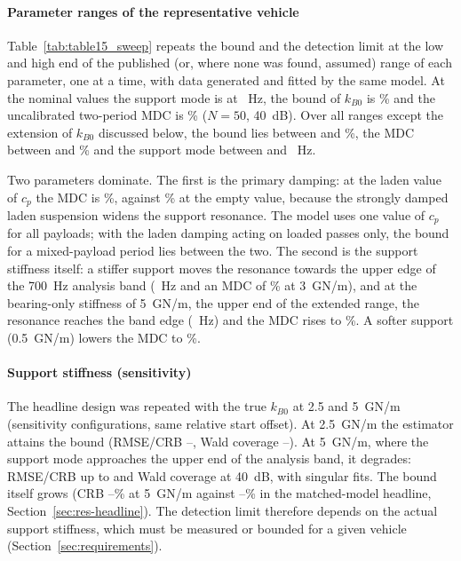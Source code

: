 
\paragraph{Parameter ranges of the representative vehicle}\label{sec:res-sweep}
Table~\ref{tab:table15_sweep} repeats the bound and the detection limit at the low and high end of the
published (or, where none was found, assumed) range of each parameter, one at a time, with data
generated and fitted by the same model. At the nominal values the support mode is at
\SweepNomMode~Hz, the bound of $k_{B0}$ is \SweepNomCRB\% and the uncalibrated two-period MDC is
\SweepNomMDC\% ($N=50$, 40~dB). Over all ranges except the extension of $k_{B0}$ discussed below, the
bound lies between \SweepCRBMin{} and \SweepCRBMax\%, the MDC between \SweepMDCMin{} and
\SweepMDCMax\% and the support mode between \SweepModeMin{} and \SweepModeMax~Hz.

Two parameters dominate. The first is the primary damping: at the laden value of $c_p$ the MDC is
\SweepCpMDCHi\%, against \SweepCpMDCLo\% at the empty value, because the strongly damped laden
suspension widens the support resonance. The model uses one value of $c_p$ for all payloads; with the
laden damping acting on loaded passes only, the bound for a mixed-payload period lies between the two.
The second is the support stiffness itself: a stiffer support moves the resonance towards the upper
edge of the 700~Hz analysis band (\SweepKBModeHi~Hz and an MDC of \SweepKBMDCHi\% at 3~GN/m), and at
the bearing-only stiffness of 5~GN/m, the upper end of the extended range, the resonance reaches the
band edge (\SweepKBExtModeHi~Hz) and the MDC rises to \SweepKBExtMDCHi\%. A softer support
(0.5~GN/m) lowers the MDC to \SweepKBMDCLo\%.

\paragraph{Support stiffness (sensitivity)}\label{sec:res-astiff}
The headline design was repeated with the true $k_{B0}$ at 2.5 and 5~GN/m (sensitivity configurations,
same relative start offset). At 2.5~GN/m the estimator attains the bound (RMSE/CRB
\AStiffTwoFiveRatioMin--\AStiffTwoFiveRatioMax, Wald coverage \AStiffTwoFiveCovMin--\AStiffTwoFiveCovMax). At
5~GN/m, where the support mode approaches the upper end of the analysis band, it degrades: RMSE/CRB up to
\AStiffRatioMax{} and Wald coverage \AStiffFiveFortyCov{} at 40~dB, with \AStiffFiveSingN{} singular fits.
The bound itself grows (CRB \AStiffCRBFiveMin--\AStiffCRBFiveMax\% at 5~GN/m against
\HLCRBMin--\HLCRBMax\% in the matched-model headline, Section~\ref{sec:res-headline}). The detection limit
therefore depends on the
actual support stiffness, which must be measured or bounded for a given vehicle
(Section~\ref{sec:requirements}).

